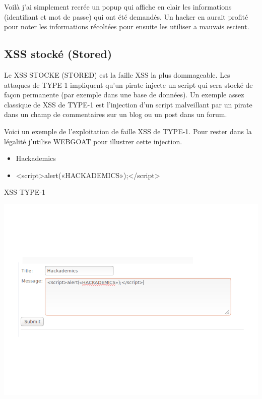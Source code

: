 \begin{flushleft}
Voilà j'ai simplement recrée un popup qui affiche en clair les informations (identifiant et mot de passe) qui ont été demandés. Un hacker en aurait profité pour noter les informations récoltées pour ensuite les utiliser a mauvais escient.
\end{flushleft}

\subsection{XSS stocké (Stored)}\label{vulnerabilites:web:xss:stored}

Le XSS STOCKE (STORED) est la faille XSS la plus dommageable. Les attaques de TYPE-1 impliquent qu'un pirate injecte un script qui sera stocké de façon permanente (par exemple dans une base de données). Un exemple assez classique de XSS de TYPE-1 est l'injection d'un script malveillant par un pirate dans un champ de commentaires sur un blog ou un post dans un forum.

\begin{flushleft}
Voici un exemple de l'exploitation de faille XSS de TYPE-1. Pour rester dans la légalité j'utilise WEBGOAT pour illustrer cette injection.
\end{flushleft}

\bigskip

\begin{itemize}
\item Hackademics
\item <script>alert(«HACKADEMICS»);</script>
\end{itemize}

\bigskip

\begin{center}
\caption{XSS TYPE-1}
\includegraphics[scale=0.3]{Web/assets/xsst1-0.png}
\end{center}

